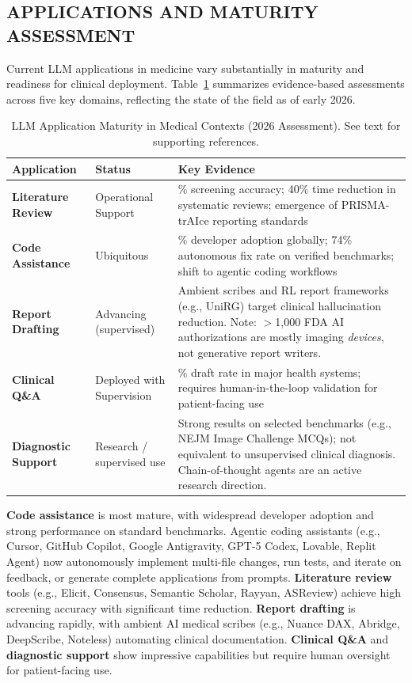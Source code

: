 \documentclass[krantz2,ChapterTOCs]{krantz}
\begin{document}
\subsection{APPLICATIONS AND MATURITY ASSESSMENT}

Current LLM applications in medicine vary substantially in maturity and readiness for clinical deployment. Table~\ref{tab:llm_maturity} summarizes evidence-based assessments across five key domains, reflecting the state of the field as of early 2026.

\begin{table}[t]
\centering
\caption{LLM Application Maturity in Medical Contexts (2026 Assessment). See text for supporting references.}
\label{tab:llm_maturity}
\small
\renewcommand{\arraystretch}{1.15}
\begin{tabular}{@{}>{\raggedright\arraybackslash}p{2.8cm}>{\raggedright\arraybackslash}p{3.2cm}>{\raggedright\arraybackslash}p{6.2cm}@{}}
\toprule
\textbf{Application} & \textbf{Status} & \textbf{Key Evidence} \\
\midrule
\textbf{Literature Review} & Operational Support & 85\% screening accuracy; 40\% time reduction in systematic reviews; emergence of PRISMA-trAIce reporting standards \\[1ex]
\textbf{Code Assistance} & Ubiquitous & 84\% developer adoption globally; 74\% autonomous fix rate on verified benchmarks; shift to agentic coding workflows \\[1ex]
\textbf{Report Drafting} & Advancing (supervised) & Ambient scribes and RL report frameworks (e.g., UniRG) target clinical hallucination reduction. Note: $>$1{,}000 FDA AI authorizations are mostly imaging \emph{devices}, not generative report writers. \\[1ex]
\textbf{Clinical Q\&A} & Deployed with Supervision & 75\% draft rate in major health systems; requires human-in-the-loop validation for patient-facing use \\[1ex]
\textbf{Diagnostic Support} & Research / supervised use & Strong results on selected benchmarks (e.g., NEJM Image Challenge MCQs); not equivalent to unsupervised clinical diagnosis. Chain-of-thought agents are an active research direction. \\
\bottomrule
\end{tabular}
\end{table}

\textbf{Code assistance} is most mature, with widespread developer adoption and strong performance on standard benchmarks. Agentic coding assistants (e.g., Cursor, GitHub Copilot, Google Antigravity, GPT-5 Codex, Lovable, Replit Agent) now autonomously implement multi-file changes, run tests, and iterate on feedback, or generate complete applications from prompts.
\textbf{Literature review} tools (e.g., Elicit, Consensus, Semantic Scholar, Rayyan, ASReview) achieve high screening accuracy with significant time reduction.
\textbf{Report drafting} is advancing rapidly, with ambient AI medical scribes (e.g., Nuance DAX, Abridge, DeepScribe, Noteless) automating clinical documentation.
\textbf{Clinical Q\&A} and \textbf{diagnostic support} show impressive capabilities but require human oversight for patient-facing use.
\end{document}
